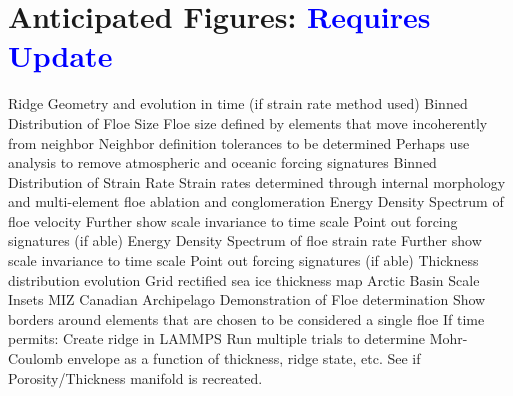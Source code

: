 \section{Anticipated Figures: \textcolor{blue}{Requires Update}}
\begin{outline}[enumerate]
\1 Ridge Geometry and evolution in time (if strain rate method used)
\1 Binned Distribution of Floe Size
\2 Floe size defined by elements that move incoherently from neighbor
\2 Neighbor definition tolerances to be determined
\2 Perhaps use analysis to remove atmospheric and oceanic forcing signatures
\1 Binned Distribution of Strain Rate
\2 Strain rates determined through internal morphology and multi-element floe ablation and conglomeration
\1 Energy Density Spectrum of floe velocity
\2 Further show scale invariance to time scale
\2 Point out forcing signatures (if able)
\1 Energy Density Spectrum of floe strain rate
\2 Further show scale invariance to time scale
\2 Point out forcing signatures (if able)
\1 Thickness distribution evolution
\1 Grid rectified sea ice thickness map
\2 Arctic Basin Scale
\2 Insets
\3 \ac{MIZ}
\3 Canadian Archipelago
\1 Demonstration of Floe determination
\2 Show borders around elements that are chosen to be considered a single floe
\1 If time permits:
\2 Create ridge in \ac{LAMMPS}
\3 Run multiple trials to determine Mohr-Coulomb envelope as a function of thickness, ridge state, etc.
\3 See if Porosity/Thickness manifold is recreated.
\end{outline}
\pagebreak

